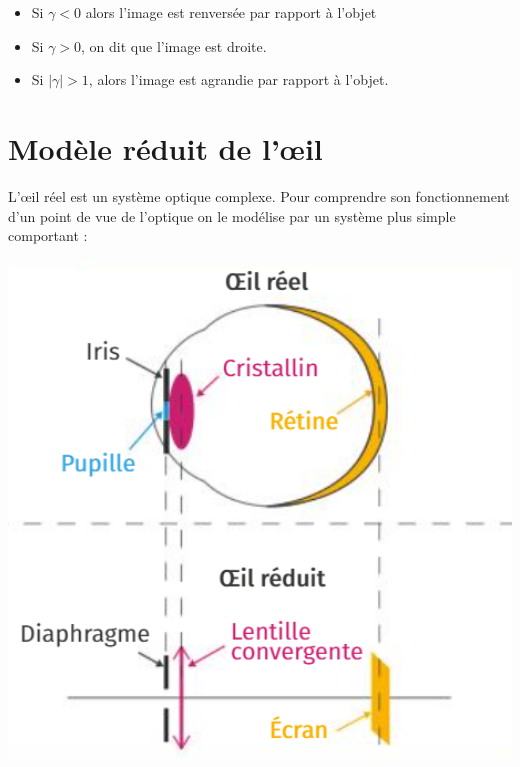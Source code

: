 \documentclass[french, a4paper, 12pt]{article}
\begin{document}
\begin{itemize}
	\item Si $\gamma < 0 $ alors l'image est renversée par rapport à l'objet 
	\item Si $\gamma >0$, on dit que l'image est droite.
	\item Si $|\gamma|>1$, alors l'image est agrandie par rapport à l'objet.
\end{itemize} 


\section{Modèle réduit de l'\oe il}
\begin{minipage}{.5\textwidth}
L'\oe il réel est un système optique complexe. Pour comprendre son fonctionnement d'un point de vue de l'optique on le modélise par un système plus simple comportant : \medskip

\end{minipage}
\begin{minipage}{.5\textwidth}
	\includegraphics*[width=1\textwidth]{oeil.png}
\end{minipage}
\end{document}
